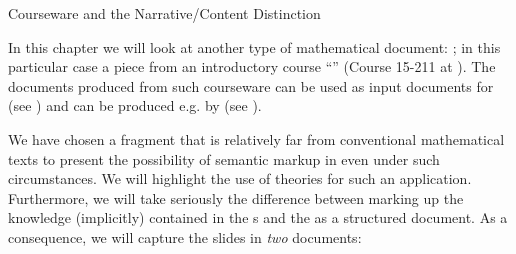 
\begin{omgroup}[id=courseware]{Courseware and the Narrative/Content Distinction}

  In this chapter we will look at another type of mathematical document:
  {}; in this particular case a piece from an introductory course
  ``{}'' (Course 15-211 at {}). The {\omdoc} documents produced from such courseware can be
  used as input documents for {\activemath} (see {}) and can
  be produced e.g. by {\cpoint} (see {}).

\begin{myfig}{15-211}{Three slides from 15-211}
  }\quad
  \fbox{\texttt{[image: \\figuresPath\{slide-862]}}}\\[1ex]
  \fbox{\texttt{[image: \\figuresPath\{slide-863]}}}\quad
  \fbox{\texttt{[image: \\figuresPath\{slide-864]}}}
\end{myfig}

We have chosen a fragment that is relatively far from conventional mathematical
texts to present the possibility of semantic markup in {\omdoc} even under such
circumstances.  We will highlight the use of {\omdoc} theories for
such an application. Furthermore, we will take seriously the difference between
marking up the knowledge (implicitly) contained in the {s} and the
{} as a structured
document. As a consequence, we will capture the slides in {\emph{two}} documents:


\end{omgroup}
